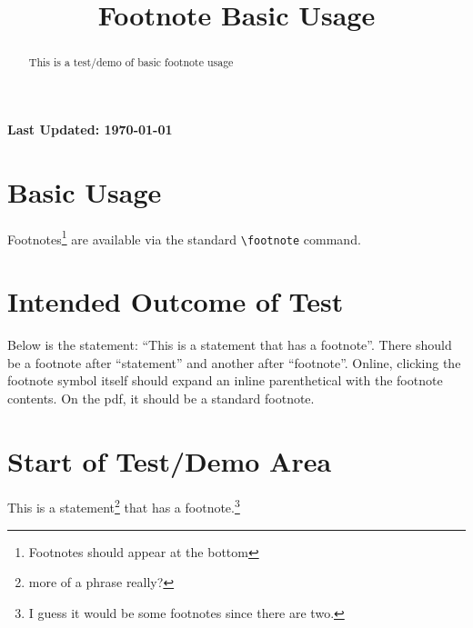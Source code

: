\documentclass{ximera}
\title{Footnote Basic Usage}
\begin{document}
\begin{abstract}
    This is a test/demo of basic footnote usage
\end{abstract}
\maketitle

{{\Huge \bfseries Last Updated: \today}} \\

\section{Basic Usage}
Footnotes\footnote{Footnotes should appear at the bottom} are available via the standard \verb|\footnote| command.


\section{Intended Outcome of Test}
Below is the statement: ``This is a statement that has a footnote''. There should be a footnote after ``statement'' and another after ``footnote''.
Online, clicking the footnote symbol itself should expand an inline parenthetical with the footnote contents. On the pdf, it should be 
a standard footnote.

\section{Start of Test/Demo Area}
This is a statement\footnote{more of a phrase really?} that has a footnote.\footnote{I guess it would be some footnotes since there are two.}

\hrulefill
\end{document}
